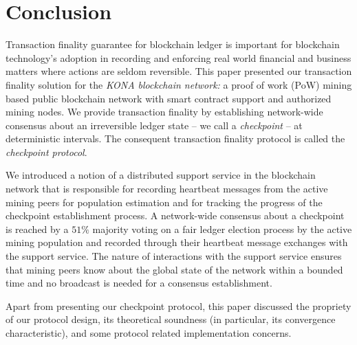\documentclass[conference]{IEEEtran}
\begin{document}


    



    
        




\section{Conclusion}
\label{s-conclusion}
Transaction finality guarantee for blockchain ledger is important for blockchain technology's adoption in recording and enforcing real world financial and business matters where actions are seldom reversible. This paper presented our transaction finality solution for the \textit{KONA blockchain network:} a proof of work (PoW) mining based public blockchain network with smart contract support and authorized mining nodes. We provide transaction finality by establishing network-wide consensus about an irreversible ledger state -- we call a \textit{checkpoint} -- at deterministic intervals. The consequent transaction finality protocol is called the \textit{checkpoint protocol}.   

We introduced a notion of a distributed support service in the blockchain network that is responsible for recording heartbeat messages from the active mining peers for population estimation and for tracking the progress of the checkpoint establishment process. A network-wide consensus about a checkpoint is reached by a $51\%$ majority voting on a fair ledger election process by the active mining population and recorded through their heartbeat message exchanges with the support service. The nature of interactions with the support service ensures that mining peers know about the global state of the network within a bounded time and no broadcast is needed for a consensus establishment. 

Apart from presenting our checkpoint protocol, this paper discussed the propriety of our protocol design, its theoretical soundness (in particular, its convergence characteristic), and some protocol related implementation concerns.
      
\end{document}

